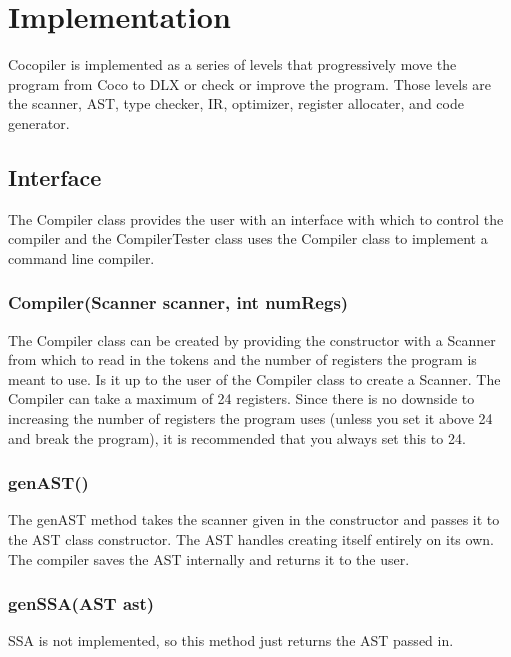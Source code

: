 \newpage
\section*{Implementation}

Cocopiler is implemented as a series of levels that progressively move the program from Coco to DLX or check or improve the program. Those levels are the scanner, AST, type checker, IR, optimizer, register allocater, and code generator. 

\subsection*{Interface}
The Compiler class provides the user with an interface with which to control the compiler and the CompilerTester class uses the Compiler class to implement a command line compiler. 
\subsubsection*{Compiler(Scanner scanner, int numRegs)}
The Compiler class can be created by providing the constructor with a Scanner from which to read in the tokens and the number of registers the program is meant to use. Is it up to the user of the Compiler class to create a Scanner. The Compiler can take a maximum of 24 registers. Since there is no downside to increasing the number of registers the program uses (unless you set it above 24 and break the program), it is recommended that you always set this to 24. 
\subsubsection*{genAST()}
The genAST method takes the scanner given in the constructor and passes it to the AST class constructor. The AST handles creating itself entirely on its own. The compiler saves the AST internally and returns it to the user. 
\subsubsection*{genSSA(AST ast)}
SSA is not implemented, so this method just returns the AST passed in. 
